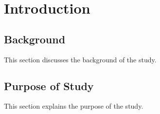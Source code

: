 
\chapter{Introduction}

\section{Background}
This section discusses the background of the study.

\section{Purpose of Study}
This section explains the purpose of the study.



